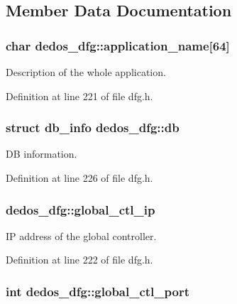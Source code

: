 \subsection{Member Data Documentation}
\hypertarget{structdedos__dfg_a0eceb9cb1a7d21b3ed8f9be508522780}{
\subsubsection[{application\-\_\-name}]{\setlength{\rightskip}{0pt plus 5cm}char dedos\-\_\-dfg\-::application\-\_\-name\mbox{[}64\mbox{]}}}\label{structdedos__dfg_a0eceb9cb1a7d21b3ed8f9be508522780}


Description of the whole application. 



Definition at line 221 of file dfg.\-h.

\hypertarget{structdedos__dfg_ad8621d636821cbbe634b07738898a17e}{
\subsubsection[{db}]{\setlength{\rightskip}{0pt plus 5cm}struct {\bf db\-\_\-info} dedos\-\_\-dfg\-::db}}\label{structdedos__dfg_ad8621d636821cbbe634b07738898a17e}


D\-B information. 



Definition at line 226 of file dfg.\-h.

\hypertarget{structdedos__dfg_acab1dc92b08936f48e02d5f1eb1a4f51}{
\subsubsection[{global\-\_\-ctl\-\_\-ip}]{ dedos\-\_\-dfg\-::global\-\_\-ctl\-\_\-ip}}\label{structdedos__dfg_acab1dc92b08936f48e02d5f1eb1a4f51}


I\-P address of the global controller. 



Definition at line 222 of file dfg.\-h.

\hypertarget{structdedos__dfg_ab0e37e7cbde75494f9f9dc509ff06faa}{
\subsubsection[{global\-\_\-ctl\-\_\-port}]{\setlength{\rightskip}{0pt plus 5cm}int dedos\-\_\-dfg\-::global\-\_\-ctl\-\_\-port}}\label{structdedos__dfg_ab0e37e7cbde75494f9f9dc509ff06faa}


